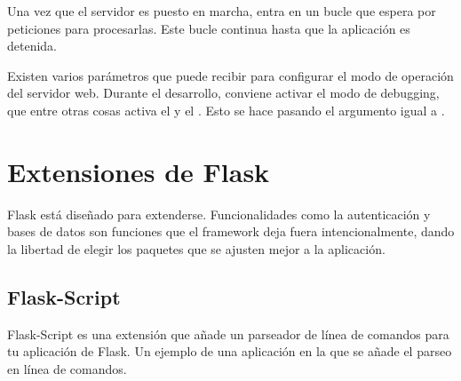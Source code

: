 \begin{sphinxVerbatim}[commandchars=\\\{\}]
   
\end{sphinxVerbatim}

Una vez que el servidor es puesto en marcha, entra en un bucle que espera por
peticiones para procesarlas. Este bucle continua hasta que la aplicación es
detenida.

Existen varios parámetros que  puede recibir para configurar el
modo de operación del servidor web. Durante el desarrollo, conviene  activar
el modo de debugging, que entre otras cosas activa el  y el .
Esto se hace pasando el argumento  igual a  .



\section*{Extensiones de Flask}
\label{\detokenize{chapter_two/desc_cloudnao:extensiones-de-flask}}
Flask está diseñado para extenderse. Funcionalidades como la autenticación y
bases de datos son funciones que el framework deja fuera intencionalmente,
dando la libertad de elegir los paquetes que se ajusten mejor a la aplicación.



\subsection*{Flask-Script}
\label{\detokenize{chapter_two/desc_cloudnao:flask-script}}
Flask-Script es una extensión que añade un parseador de línea de comandos
para tu aplicación de Flask. Un ejemplo de una aplicación en la que se añade
el parseo en línea de comandos.

\begin{sphinxVerbatim}[commandchars=\\\{\}]
   
    

  
   

   
\end{sphinxVerbatim}

